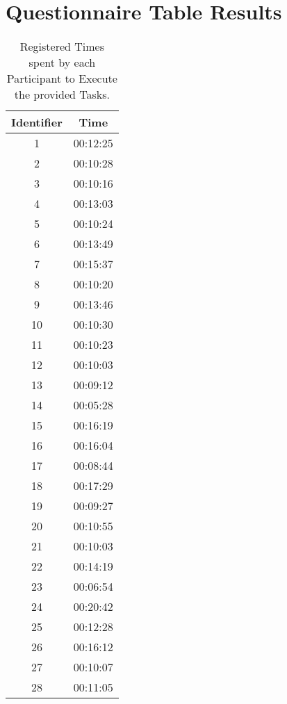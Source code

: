 
%


\chapter{Questionnaire Table Results}
\label{app:table_times}

\begin{table}[h!]
\centering
\caption{Registered Times spent by each Participant to Execute the provided Tasks.}
\begin{tabular}{|c|c|}
\hline
\textbf{Identifier} & \textbf{Time} \\
\hline
1 & 00:12:25 \\ \hline
2 & 00:10:28 \\ \hline
3 & 00:10:16 \\ \hline
4 & 00:13:03 \\ \hline
5 & 00:10:24 \\ \hline
6 & 00:13:49 \\ \hline
7 & 00:15:37 \\ \hline
8 & 00:10:20 \\ \hline
9 & 00:13:46 \\ \hline
10 & 00:10:30 \\ \hline
11 & 00:10:23 \\ \hline
12 & 00:10:03 \\ \hline
13 & 00:09:12 \\ \hline
14 & 00:05:28 \\ \hline
15 & 00:16:19 \\ \hline
16 & 00:16:04 \\ \hline
17 & 00:08:44 \\ \hline
18 & 00:17:29 \\ \hline
19 & 00:09:27 \\ \hline
20 & 00:10:55 \\ \hline
21 & 00:10:03 \\ \hline
22 & 00:14:19 \\ \hline
23 & 00:06:54 \\ \hline
24 & 00:20:42 \\ \hline
25 & 00:12:28 \\ \hline
26 & 00:16:12 \\ \hline
27 & 00:10:07 \\ \hline
28 & 00:11:05 \\ \hline
\end{tabular}
\end{table}